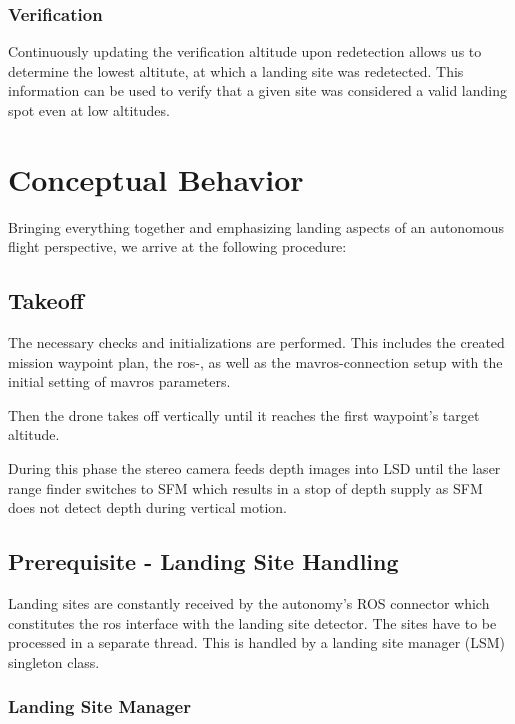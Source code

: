 \subsubsection{Verification}

Continuously updating the verification altitude upon redetection allows us to determine the lowest altitute, at which a landing site was redetected. This information can be used to verify that a given site was considered a valid landing spot even at low altitudes. 

\section{Conceptual Behavior}

Bringing everything together and emphasizing landing aspects of an autonomous flight perspective, we arrive at the following procedure:

\subsection{Takeoff}

The necessary checks and initializations are performed. This includes the created mission waypoint plan, the ros-, as well as the mavros-connection setup with the initial setting of mavros parameters.

Then the drone takes off vertically until it reaches the first waypoint's target altitude.

During this phase the stereo camera feeds depth images into LSD until the laser range finder switches to SFM which results in a stop of depth supply as SFM does not detect depth during vertical motion.



\subsection{Prerequisite - Landing Site Handling}

Landing sites are constantly received by the autonomy's ROS connector which constitutes the ros interface with the landing site detector. The sites have to be processed in a separate thread. This is handled by a landing site manager (LSM) singleton class.

\subsubsection{Landing Site Manager}

